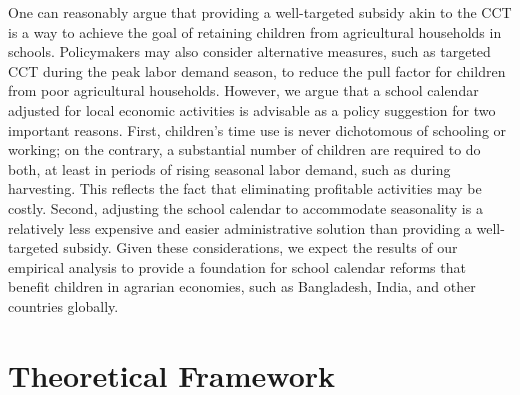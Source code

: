 \documentclass[12pt,letterpaper]{article}
\newcommand{\bfbeta}{\ensuremath{\mbox{\boldmath $\beta$}}}
\newcommand{\bfgamma}{\ensuremath{\mbox{\boldmath $\gamma$}}}
\newcommand{\bfomega}{\ensuremath{\mbox{\boldmath $\omega$}}}
\newcommand{\bfm}{\ensuremath{\mbox{\bf m}}}
\newcommand{\0}{\ensuremath{\mbox{\boldmath $0$}}}
\begin{document}
One can reasonably argue that providing a well-targeted subsidy akin to the CCT is a way to achieve the goal of retaining children from agricultural households in schools. Policymakers may also consider alternative measures, such as targeted CCT during the peak labor demand season, to reduce the pull factor for children from poor agricultural households. However, we argue that a school calendar adjusted for local economic activities is advisable as a policy suggestion for two important reasons. First, children’s time use is never dichotomous of schooling or working; on the contrary, a substantial number of children are required to do both, at least in periods of rising seasonal labor demand, such as during harvesting. This reflects the fact that eliminating profitable activities may be costly. Second, adjusting the school calendar to accommodate seasonality is a relatively less expensive and easier administrative solution than providing a well-targeted subsidy. Given these considerations, we expect the results of our empirical analysis to provide a foundation for school calendar reforms that benefit children in agrarian economies, such as Bangladesh, India, and other countries globally.




\pagebreak

\doublespacing



\pagebreak
\renewcommand{\thefigure}{A\arabic{figure}}
\renewcommand{\theHfigure}{A\arabic{figure}}
\setcounter{figure}{0}

\renewcommand{\thetable}{A\arabic{table}}
\renewcommand{\theHtable}{A\arabic{table}}
\setcounter{table}{0}

\appendix
\setcounter{secnumdepth}{1}
\setcounter{section}{0}
\renewcommand{\thesection}{A\arabic{section}}


\section{Theoretical Framework}\label{app_a1}
\setcounter{equation}{0}
\renewcommand{\theequation}{A\arabic{equation}}
\newcommand{\defeq}{\mathrel{\mathop:}=}
\newcommand{\bfbeta}{\ensuremath{\mbox{\boldmath $\beta$}}}
\newcommand{\bfgamma}{\ensuremath{\mbox{\boldmath $\gamma$}}}
\newcommand{\bfomega}{\ensuremath{\mbox{\boldmath $\omega$}}}
\newcommand{\bfc}{\ensuremath{\mbox{\boldmath $c$}}}
\newcommand{\bfm}{\ensuremath{\mbox{\boldmath $m$}}}
\end{document}

